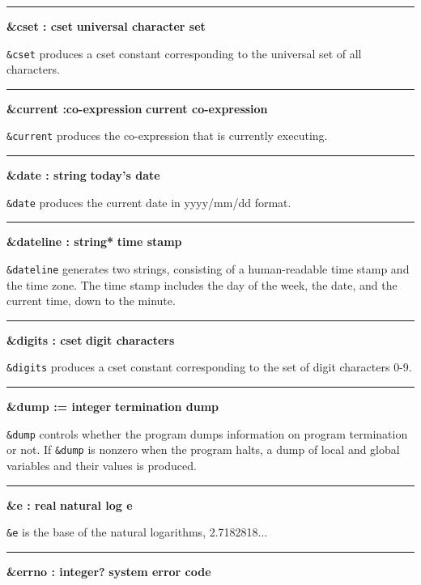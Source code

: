 \bigskip\hrule\vspace{0.1cm}
\noindent
{\bf \&cset : cset } \hfill {\bf universal character set}

\noindent
{}\texttt{\&cset} produces a cset constant
corresponding to the universal set of all characters.

\bigskip\hrule\vspace{0.1cm}
\noindent
{\bf \&current :co{}-expression } \hfill {\bf current co{}-expression}

\noindent
{}\texttt{\&current} produces the
co-expression that is currently executing.

\bigskip\hrule\vspace{0.1cm}
\noindent
{\bf \&date : string } \hfill {\bf today's date}

\noindent
{}\texttt{\&date} produces the current
date in yyyy/mm/dd format.

\bigskip\hrule\vspace{0.1cm}
\noindent
{\bf \&dateline : string* } \hfill {\bf time stamp}

\noindent
{}\texttt{\&dateline} generates two strings, consisting of a human-readable time
stamp and the time zone. The time stamp includes the day of the week, the date, and the current
time, down to the minute.

\bigskip\hrule\vspace{0.1cm}
\noindent
{\bf \&digits : cset } \hfill {\bf digit characters}

\noindent
{}\texttt{\&digits} produces a cset constant
corresponding to the set of digit characters 0-9.

\bigskip\hrule\vspace{0.1cm}
\noindent
{\bf \&dump := integer } \hfill {\bf termination dump}

\noindent
\texttt{\&dump} controls whether the program dumps information on
program termination or not. If \texttt{\&dump} is nonzero when the
program halts, a dump of local and global variables and their values is
produced.

\bigskip\hrule\vspace{0.1cm}
\noindent
{\bf \&e : real } \hfill {\bf natural log e}

\noindent
{}\texttt{\&e} is the base of the natural
logarithms, 2.7182818...

\bigskip\hrule\vspace{0.1cm}
\noindent
{\bf \&errno : integer? } \hfill {\bf system error code}

